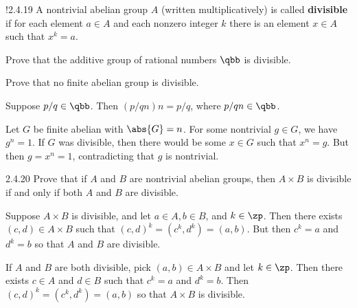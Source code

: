\begin{exercise}!{2.4.19} 
    A nontrivial abelian group $A$ (written multiplicatively) is called \textbf{divisible} if for each element $a\in A$ and each nonzero integer $k$ there is an element $x\in A$ such that $x^k=a$.  
    \begin{subexercises}
        \item Prove that the additive group of rational numbers $\qbb$ is divisible.
        \item Prove that no finite abelian group is divisible.
    \end{subexercises}
\end{exercise}

\begin{solenum}
    \item Suppose $p/q \in \qbb$.
	Then $(p/qn)n = p/q$, where $p/qn \in \qbb$.
    \item Let $G$ be finite abelian with $\abs{G} = n$.
	For some nontrivial $g \in G$, we have $g^n = 1$.
	If $G$ was divisible, then there would be some $x \in G$ such that $x^n = g$.
	But then $g = x^n = 1$, contradicting that $g$ is nontrivial.
\end{solenum}

\begin{exercise}{2.4.20}
    Prove that if $A$ and $B$ are nontrivial abelian groups, then $A\times B$ is divisible if and only if both $A$ and $B$ are divisible.
\end{exercise}

\begin{sol}
    Suppose $A \times B$ is divisible, and let $a \in A, b \in B$, and $k \in \zp$.
	Then there exists $(c, d) \in A \times B$ such that $(c, d)^k = (c^k, d^k) = (a, b)$.
	But then $c^k = a$ and $d^k = b$ so that $A$ and $B$ are divisible.
    
    If $A$ and $B$ are both divisible, pick $(a, b) \in A \times B$ and let $k \in \zp$.
	Then there exists $c \in A$ and $d \in B$ such that $c^k = a$ and $d^k = b$.
	Then $(c, d)^k = (c^k, d^k) = (a, b)$ so that $A \times B$ is divisible.
\end{sol}